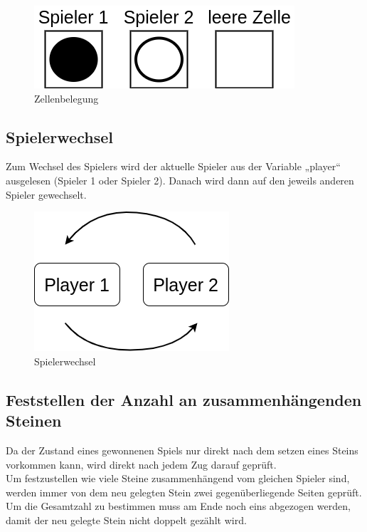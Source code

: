         \begin{figure}[H]
            \centering
            \includegraphics[scale=0.5]{img/steine.png}    
            \caption{Zellenbelegung}
        \end{figure}

    \subsection{Spielerwechsel}
        Zum Wechsel des Spielers wird der aktuelle Spieler aus der Variable „player“ ausgelesen (Spieler 1 oder Spieler 2).
        Danach wird dann auf den jeweils anderen Spieler gewechselt.

        \begin{figure}[H]
            \centering
            \includegraphics[scale=0.5]{img/spielerwechsel.png}    
            \caption{Spielerwechsel}
        \end{figure}


    \subsection{Feststellen der Anzahl an zusammenhängenden Steinen}
        Da der Zustand eines gewonnenen Spiels nur direkt nach dem setzen eines Steins vorkommen kann,
        wird direkt nach jedem Zug darauf geprüft.
        \\
        Um festzustellen wie viele Steine zusammenhängend vom gleichen Spieler sind,
        werden immer von dem neu gelegten Stein zwei gegenüberliegende Seiten geprüft.
        Um die Gesamtzahl zu bestimmen muss am Ende noch eins abgezogen werden,
        damit der neu gelegte Stein nicht doppelt gezählt wird.

